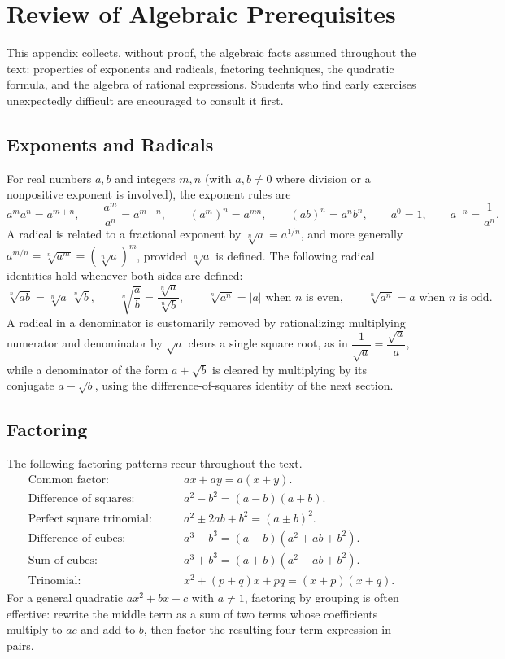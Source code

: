 \chapter{Review of Algebraic Prerequisites}
\label{app:algebra}

This appendix collects, without proof, the algebraic facts assumed throughout
the text: properties of exponents and radicals, factoring techniques, the
quadratic formula, and the algebra of rational expressions. Students who find
early exercises unexpectedly difficult are encouraged to consult it first.

\section{Exponents and Radicals}

For real numbers $a, b$ and integers $m, n$ (with $a, b \neq 0$ where
division or a nonpositive exponent is involved), the exponent rules are
\[
a^m a^n = a^{m+n}, \qquad \frac{a^m}{a^n} = a^{m-n}, \qquad (a^m)^n =
a^{mn}, \qquad (ab)^n = a^n b^n, \qquad a^0 = 1, \qquad a^{-n} =
\frac{1}{a^n}.
\]
A radical is related to a fractional exponent by $\sqrt[n]{a} =
a^{1/n}$, and more generally $a^{m/n} = \sqrt[n]{a^m} =
\left(\sqrt[n]{a}\right)^m$, provided $\sqrt[n]{a}$ is defined. The
following radical identities hold whenever both sides are defined:
\[
\sqrt[n]{ab} = \sqrt[n]{a}\,\sqrt[n]{b}, \qquad
\sqrt[n]{\frac{a}{b}} = \frac{\sqrt[n]{a}}{\sqrt[n]{b}}, \qquad
\sqrt[n]{a^n} = |a| \text{ when } n \text{ is even}, \qquad
\sqrt[n]{a^n} = a \text{ when } n \text{ is odd}.
\]
A radical in a denominator is customarily removed by rationalizing:
multiplying numerator and denominator by $\sqrt{a}$ clears a single
square root, as in $\dfrac{1}{\sqrt{a}} = \dfrac{\sqrt{a}}{a}$, while a
denominator of the form $a + \sqrt{b}$ is cleared by multiplying by its
conjugate $a - \sqrt{b}$, using the difference-of-squares identity of the
next section.

\section{Factoring}

The following factoring patterns recur throughout the text.
\begin{align*}
\text{Common factor:} \qquad & ax + ay = a(x+y). \\
\text{Difference of squares:} \qquad & a^2 - b^2 = (a-b)(a+b). \\
\text{Perfect square trinomial:} \qquad & a^2 \pm 2ab + b^2 = (a \pm
b)^2. \\
\text{Difference of cubes:} \qquad & a^3 - b^3 = (a-b)(a^2+ab+b^2). \\
\text{Sum of cubes:} \qquad & a^3 + b^3 = (a+b)(a^2-ab+b^2). \\
\text{Trinomial:} \qquad & x^2 + (p+q)x + pq = (x+p)(x+q).
\end{align*}
For a general quadratic $ax^2+bx+c$ with $a \neq 1$, factoring by
grouping is often effective: rewrite the middle term as a sum of two
terms whose coefficients multiply to $ac$ and add to $b$, then factor the
resulting four-term expression in pairs.

